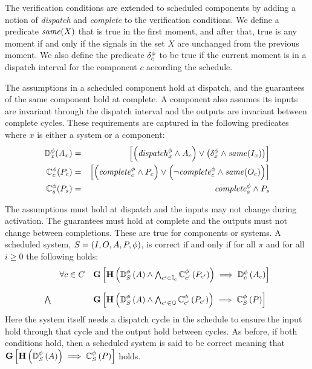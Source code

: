 The verification conditions are extended to scheduled components by adding a notion of \textit{dispatch} and \textit{complete} to the verification conditions.
We define a predicate $\mathit{same}(X)$ that is true in the first moment, and after that, true is any moment if and only if the signals in the set $X$ are unchanged from the previous moment.
We also define the predicate $\delta^\phi_c$ to be true if the current moment is in a dispatch interval for the component $c$ according the schedule.

The assumptions in a scheduled component hold at dispatch, and the guarantees of the same component hold at complete.
A component also assumes its inputs are invariant through the dispatch interval and the outputs are invariant between complete cycles.
These requirements are captured in the following predicates where $x$ is either a system or a component:
\begin{eqnarray*}
  \mathbb{D}^\phi_x(A_x) &=& \left[\left(\mathit{dispatch}^{\phi}_x \wedge A_c\right) \vee \left(\delta^\phi_x \wedge \mathit{same}(I_x)\right)\right] \\
  \mathbb{C}^\phi_c(P_c) &=& \left[\left(\mathit{complete}^{\phi}_c \wedge P_c\right) \vee \left(\neg\mathit{complete}^{\phi}_c \wedge \mathit{same}(O_c)\right)\right] \\
  \mathbb{C}^\phi_s(P_s) &=& \mathit{complete}^{\phi}_s \wedge P_s
\end{eqnarray*}

The assumptions must hold at dispatch and the inputs may not change during activation.
The guarantees must hold at complete and the outputs must not change between completions.
These are true for components or systems.
A scheduled system, $S = (I, O, A, P, \phi)$, is correct if and only if for all $\pi$ and for all $i \ge 0$ the following holds:
\[
\begin{array}{lll}
        & \forall c \in C &  
            \mathbf{G}\left[\mathbf{H}\left(\mathbb{D}^\phi_S\left(A\right) \wedge 
            \bigwedge_{c^\prime \in \mathbb{I}_c} \mathbb{C}^\phi_{c^\prime}\left(P_{c^\prime}\right)\right) 
            \implies \mathbb{D}^\phi_c\left(A_c\right)\right] \\ \\
 \bigwedge &   & 
            \mathbf{G}\left[\mathbf{H}\left(\mathbb{D}^\phi_S\left(A\right) \wedge 
            \bigwedge_{c^\prime \in \mathbb{O}} \mathbb{C}^\phi_{c^\prime}\left(P_{c^\prime}\right)\right)
            \implies \mathbb{C}^\phi_{S}\left(P\right)\right]
\end{array}
\]
Here the system itself needs a dispatch cycle in the schedule to ensure the input hold through that cycle and the output hold between cycles. As before, if both conditions hold, then a scheduled system is said to be correct meaning that $\mathbf{G}\left[\mathbf{H}\left(\mathbb{D}^\phi_S\left(A\right)\right) 
\implies \mathbb{C}^\phi_{S}\left(P\right)\right]$ holds.
